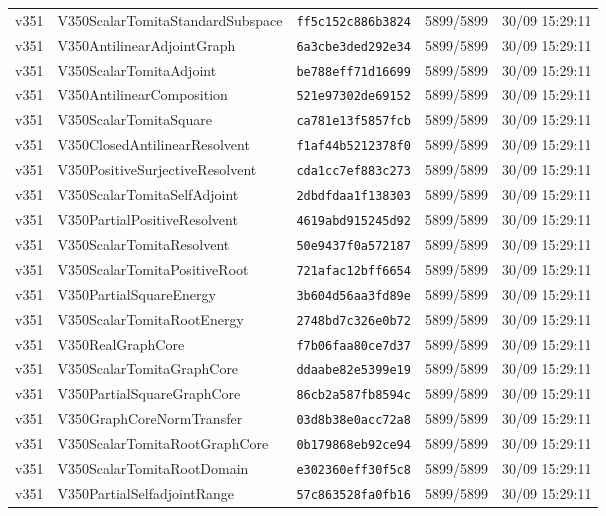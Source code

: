 \documentclass[11pt]{article}
\theoremstyle{definition}\newtheorem{deriv}{Derivação}
\begin{document}
{\begin{longtable}{@{}lllll@{}}
v351 & V350ScalarTomitaStandardSubspace & \texttt{ff5c152c886b3824} & 5899/5899 & 30/09 15:29:11 \\
v351 & V350AntilinearAdjointGraph & \texttt{6a3cbe3ded292e34} & 5899/5899 & 30/09 15:29:11 \\
v351 & V350ScalarTomitaAdjoint & \texttt{be788eff71d16699} & 5899/5899 & 30/09 15:29:11 \\
v351 & V350AntilinearComposition & \texttt{521e97302de69152} & 5899/5899 & 30/09 15:29:11 \\
v351 & V350ScalarTomitaSquare & \texttt{ca781e13f5857fcb} & 5899/5899 & 30/09 15:29:11 \\
v351 & V350ClosedAntilinearResolvent & \texttt{f1af44b5212378f0} & 5899/5899 & 30/09 15:29:11 \\
v351 & V350PositiveSurjectiveResolvent & \texttt{cda1cc7ef883c273} & 5899/5899 & 30/09 15:29:11 \\
v351 & V350ScalarTomitaSelfAdjoint & \texttt{2dbdfdaa1f138303} & 5899/5899 & 30/09 15:29:11 \\
v351 & V350PartialPositiveResolvent & \texttt{4619abd915245d92} & 5899/5899 & 30/09 15:29:11 \\
v351 & V350ScalarTomitaResolvent & \texttt{50e9437f0a572187} & 5899/5899 & 30/09 15:29:11 \\
v351 & V350ScalarTomitaPositiveRoot & \texttt{721afac12bff6654} & 5899/5899 & 30/09 15:29:11 \\
v351 & V350PartialSquareEnergy & \texttt{3b604d56aa3fd89e} & 5899/5899 & 30/09 15:29:11 \\
v351 & V350ScalarTomitaRootEnergy & \texttt{2748bd7c326e0b72} & 5899/5899 & 30/09 15:29:11 \\
v351 & V350RealGraphCore & \texttt{f7b06faa80ce7d37} & 5899/5899 & 30/09 15:29:11 \\
v351 & V350ScalarTomitaGraphCore & \texttt{ddaabe82e5399e19} & 5899/5899 & 30/09 15:29:11 \\
v351 & V350PartialSquareGraphCore & \texttt{86cb2a587fb8594c} & 5899/5899 & 30/09 15:29:11 \\
v351 & V350GraphCoreNormTransfer & \texttt{03d8b38e0acc72a8} & 5899/5899 & 30/09 15:29:11 \\
v351 & V350ScalarTomitaRootGraphCore & \texttt{0b179868eb92ce94} & 5899/5899 & 30/09 15:29:11 \\
v351 & V350ScalarTomitaRootDomain & \texttt{e302360eff30f5c8} & 5899/5899 & 30/09 15:29:11 \\
v351 & V350PartialSelfadjointRange & \texttt{57c863528fa0fb16} & 5899/5899 & 30/09 15:29:11 \\

\end{longtable}}
\end{document}

